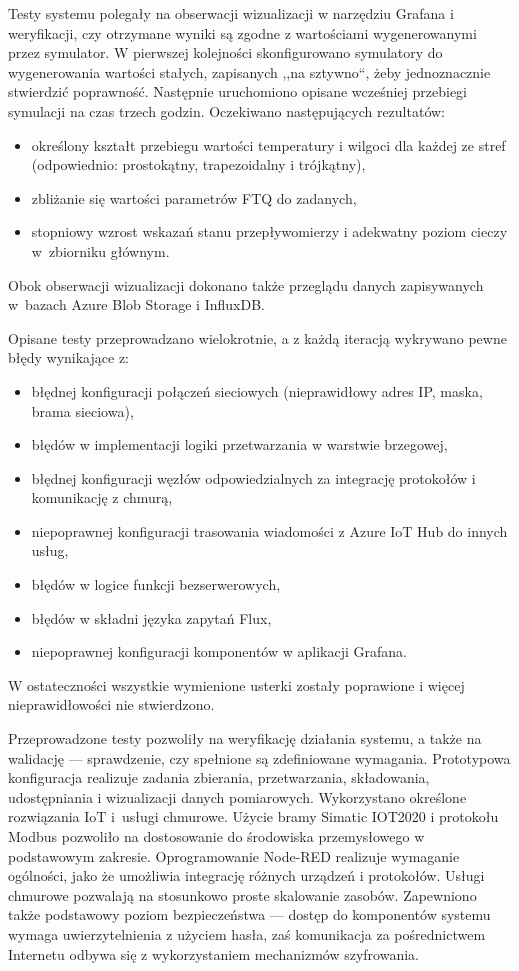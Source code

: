 \documentclass[a4paper, 12pt, twoside]{article}
\begin{document}
Testy systemu polegały na obserwacji wizualizacji w narzędziu Grafana i weryfikacji,
czy otrzymane wyniki są zgodne z wartościami wygenerowanymi przez symulator.
W pierwszej kolejności skonfigurowano symulatory do wygenerowania wartości stałych,
zapisanych ,,na sztywno``, żeby jednoznacznie stwierdzić poprawność. Następnie
uruchomiono opisane wcześniej przebiegi symulacji na czas trzech godzin.
Oczekiwano następujących rezultatów:
\begin{itemize}
      \itemsep0em
      \item określony kształt przebiegu wartości temperatury i wilgoci dla każdej
            ze stref (odpowiednio: prostokątny, trapezoidalny i trójkątny),
      \item zbliżanie się wartości parametrów FTQ do zadanych,
      \item stopniowy wzrost wskazań stanu przepływomierzy i adekwatny poziom cieczy
            w~zbiorniku głównym.
\end{itemize}
\noindent Obok obserwacji wizualizacji dokonano także przeglądu danych zapisywanych
w~bazach Azure Blob Storage i InfluxDB.

Opisane testy przeprowadzano wielokrotnie, a z każdą iteracją wykrywano
pewne błędy wynikające z:
\begin{itemize}
      \itemsep0em
      \item błędnej konfiguracji połączeń sieciowych (nieprawidłowy adres IP, maska, brama sieciowa),
      \item błędów w implementacji logiki przetwarzania w warstwie brzegowej,
      \item błędnej konfiguracji węzłów odpowiedzialnych za integrację protokołów i komunikację z chmurą,
      \item niepoprawnej konfiguracji trasowania wiadomości z Azure IoT Hub do innych usług,
      \item błędów w logice funkcji bezserwerowych,
      \item błędów w składni języka zapytań Flux,
      \item niepoprawnej konfiguracji komponentów w aplikacji Grafana.
\end{itemize}
\noindent W ostateczności wszystkie wymienione usterki zostały poprawione i więcej nieprawidłowości nie
stwierdzono.

Przeprowadzone testy pozwoliły na weryfikację działania systemu, a także na
walidację --- sprawdzenie, czy spełnione są zdefiniowane wymagania. Prototypowa
konfiguracja realizuje zadania zbierania, przetwarzania, składowania,
udostępniania i wizualizacji danych pomiarowych. Wykorzystano określone rozwiązania
IoT i~usługi chmurowe. Użycie bramy Simatic IOT2020 i protokołu Modbus pozwoliło na dostosowanie
do środowiska przemysłowego w podstawowym zakresie. Oprogramowanie Node-RED
realizuje wymaganie ogólności, jako że umożliwia integrację różnych urządzeń i protokołów.
Usługi chmurowe pozwalają na stosunkowo proste skalowanie zasobów. Zapewniono
także podstawowy poziom bezpieczeństwa --- dostęp do komponentów systemu wymaga uwierzytelnienia
z użyciem hasła, zaś komunikacja za pośrednictwem Internetu odbywa się z wykorzystaniem mechanizmów
szyfrowania.
\end{document}

